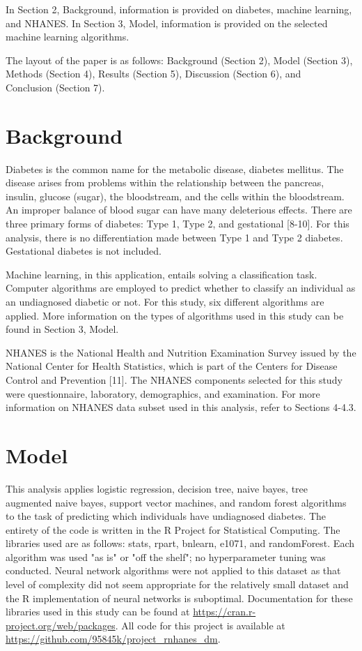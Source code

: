 \documentclass[twoside,11pt]{article}
\begin{document}
In Section 2, Background, information is provided on diabetes, machine learning, and NHANES. In Section 3, Model, information is provided on the selected machine learning algorithms. 

The layout of the paper is as follows:
Background (Section 2), Model (Section 3), Methods (Section 4), Results (Section 5), Discussion (Section 6), and \\Conclusion (Section 7). 

\section{Background} \label{background}
Diabetes is the common name for the metabolic disease, diabetes mellitus. The disease arises from problems within the relationship between the pancreas, insulin, glucose (sugar), the bloodstream, and the cells within the bloodstream. An improper balance of blood sugar can have many deleterious effects. There are three primary forms of diabetes: Type 1, Type 2, and gestational [8-10]. For this analysis, there is no differentiation made between Type 1 and Type 2 diabetes. Gestational diabetes is not included. 

Machine learning, in this application, entails solving a classification task. Computer algorithms are employed to predict whether to classify an individual as an undiagnosed diabetic or not. For this study, six different algorithms are applied. More information on the types of algorithms used in this study can be found in Section 3, Model. 

NHANES is the National Health and Nutrition Examination Survey issued by the National Center for Health Statistics, which is part of the Centers for Disease Control and Prevention [11]. The NHANES components selected for this study were questionnaire, laboratory, demographics, and examination. For more information on NHANES data subset used in this analysis, refer to Sections 4-4.3. 

\section{Model} \label{model}
This analysis applies logistic regression, decision tree, naive bayes, tree augmented naive bayes, support vector machines, and random forest algorithms to the task of predicting which individuals have undiagnosed diabetes. The entirety of the code is written in the R Project for Statistical Computing. The libraries used are as follows: stats, rpart, bnlearn, e1071, and randomForest. Each algorithm was used "as is" or "off the shelf"; no hyperparameter tuning was conducted. Neural network algorithms were not applied to this dataset as that level of complexity did not seem appropriate for the relatively small dataset and the R implementation of neural networks is suboptimal. Documentation for these libraries used in this study can be found at \url{https://cran.r-project.org/web/packages}. All code for this project is available at \url{https://github.com/95845k/project_rnhanes_dm}.
\end{document}
